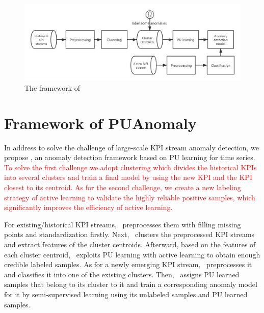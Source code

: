 \begin{figure}
  \centering
  \includegraphics[width=0.9\linewidth]{ADS_Journal/PU figures/Whole Framework (1).png}
  \caption{
    The framework of~\name{}
  }
  \label{fig:overview}
  \vspace{-6 mm}
\end{figure}

\section{Framework of PUAnomaly}
\label{sec:algorithm}
In address to solve the challenge of large-scale KPI stream anomaly detection, we propose \name{}, an anomaly detection framework based on PU learning for time series.
\textcolor{red}{To solve the first challenge we adopt clustering which divides the historical KPIs into several clusters and train a final model by using the new KPI and the KPI closest to its centroid.
As for the second challenge, we create a new labeling strategy of active learning to validate the highly reliable positive samples, which significantly improves the efficiency of active learning.}

 
 For existing/historical KPI streams, \name~preprocesses them with filling missing points and standardization firstly. Next, \name~clusters the preprocessed KPI streams and extract features of the cluster centroids. Afterward, based on the features of each cluster centroid, \name~exploits PU learning with active learning to obtain enough credible labeled samples. 
 As for a newly emerging KPI stream, \name~preprocesses it and classifies it into one of the existing clusters. Then, \name~assigns PU learned samples that belong to its cluster to it and train a corresponding anomaly model for it by semi-supervised learning using its unlabeled samples and PU learned samples.

